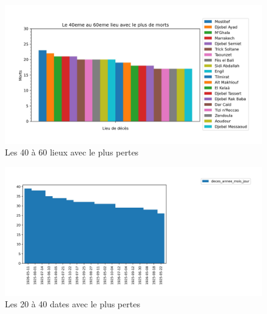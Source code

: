 \begin{figure}[h]
    \centering
    \includegraphics[scale=0.7]{Images/last20places.jpg}
    \caption{Les 40 à 60 lieux avec le plus pertes}
    \label{fig:Lieux 3}
\end{figure}
\begin{figure}[h]
    \centering
    \includegraphics[scale=0.67]{Images/next20dates.jpg}
    \caption{Les 20 à 40 dates avec le plus pertes}
    \label{fig:Dates 2}
\end{figure}